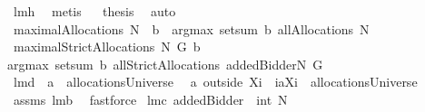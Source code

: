 \begin{isabellebody}
\ lm{}{}h\ \isamarkupfalse%
\ metis\isanewline
{}\isamarkupfalse%
\ \isamarkupfalse%
\ {\isacharquery}thesis\ \isamarkupfalse%
\ auto\isanewline
{}\isamarkupfalse%
%
\endisatagproof
{\isafoldproof}%
%
\isadelimproof
\isanewline
%
\endisadelimproof
\isanewline
{}\isamarkupfalse%
\ {\isachardoublequoteopen}maximalAllocations{\isacharprime}{\isacharprime}\ N\ {\isasymOmega}\ b\ {\isacharequal}{\isacharequal}\ argmax\ {\isacharparenleft}setsum\ b{\isacharparenright}\ {\isacharparenleft}allAllocations{\isacharprime}\ N\ {\isasymOmega}{\isacharparenright}{\isachardoublequoteclose}\isanewline
\isanewline
{}\isamarkupfalse%
\ {\isachardoublequoteopen}maximalStrictAllocations{\isacharprime}\ N\ G\ b{\isacharequal}{\isacharequal}\isanewline
argmax\ {\isacharparenleft}setsum\ b{\isacharparenright}\ {\isacharparenleft}allStrictAllocations{\isacharprime}\ {\isacharparenleft}{\isacharbraceleft}addedBidder{\isacharprime}{\isacharbraceright}{\isasymunion}N{\isacharparenright}\ G{\isacharparenright}{\isachardoublequoteclose}\isanewline
\isanewline
\isanewline
\isanewline
{}\isamarkupfalse%
\ lm{}{}d{\isacharcolon}\ \ {\isachardoublequoteopen}a\ {\isasymin}\ allocationsUniverse{\isachardoublequoteclose}\ \ \isanewline
{\isachardoublequoteopen}{\isacharparenleft}a\ outside\ {\isacharparenleft}X{\isasymunion}{\isacharbraceleft}i{\isacharbraceright}{\isacharparenright}{\isacharparenright}\ {\isasymunion}\ {\isacharparenleft}{\isacharbraceleft}i{\isacharbraceright}{\isasymtimes}{\isacharparenleft}{\isacharbraceleft}{\isasymUnion}{\isacharparenleft}a{\isacharbackquote}{\isacharbackquote}{\isacharparenleft}X{\isasymunion}{\isacharbraceleft}i{\isacharbraceright}{\isacharparenright}{\isacharparenright}{\isacharbraceright}{\isacharminus}{\isacharbraceleft}{\isacharbraceleft}{\isacharbraceright}{\isacharbraceright}{\isacharparenright}{\isacharparenright}\ {\isasymin}\ allocationsUniverse{\isachardoublequoteclose}%
\isadelimproof
\ %
\endisadelimproof
%
\isatagproof
{}\isamarkupfalse%
\ assms\ lm{}{}b\ \isanewline
{}\isamarkupfalse%
\ fastforce%
\endisatagproof
{\isafoldproof}%
%
\isadelimproof
%
\endisadelimproof
\isanewline
\isanewline
{}\isamarkupfalse%
\ lm{}{}c{\isacharcolon}\ {\isachardoublequoteopen}addedBidder{\isacharprime}\ {\isasymnotin}\ int\ {\isacharbackquote}N{\isachardoublequoteclose}%

\end{isabellebody}
